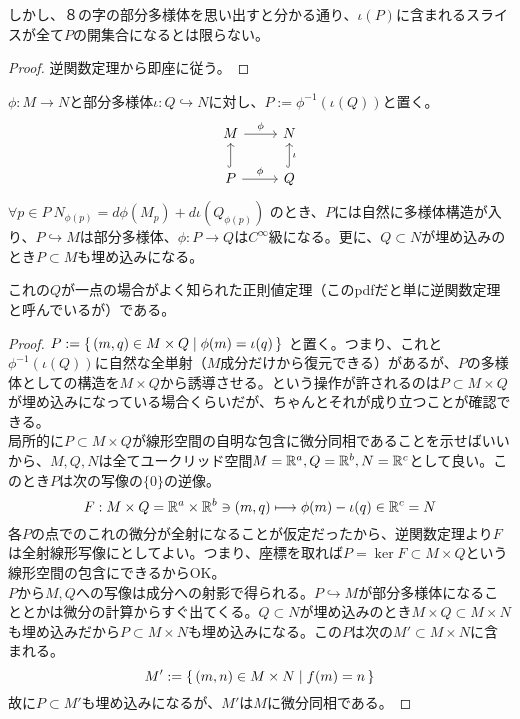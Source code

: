 しかし、８の字の部分多様体を思い出すと分かる通り、$\iota(P)$に含まれるスライスが全て$P$の開集合になるとは限らない。
\begin{proof}
    逆関数定理から即座に従う。
\end{proof}
\begin{thm}[正則値定理]
    $\phi:M\to N$と部分多様体$\iota:Q\hookrightarrow N$に対し、$P:=\phi^{-1}(\iota(Q))$と置く。
    \[\begin{tikzcd}
        M\arrow[r,"\phi"] &N\\
        P\arrow[u,hook]\arrow[r,"\phi"] &Q\arrow[u,hook,"\iota"']
    \end{tikzcd}\]
    $\forall p\in P\ N_{\phi(p)}=d\phi(M_p)+d\iota(Q_{\phi(p)})$ のとき、$P$には自然に多様体構造が入り、$P\hookrightarrow M$は部分多様体、$\phi:P\to Q$は$C^\infty$級になる。更に、$Q\subset N$が埋め込みのとき$P\subset M$も埋め込みになる。
\end{thm}
これの$Q$が一点の場合がよく知られた正則値定理（このpdfだと単に逆関数定理と呼んでいるが）である。
\begin{proof}
    $P:=\{\, (m,q)\in M\times Q\mid \phi(m)=\iota(q)\,\}$ と置く。つまり、これと$\phi^{-1}(\iota(Q))$に自然な全単射（$M$成分だけから復元できる）があるが、$P$の多様体としての構造を$M\times Q$から誘導させる。という操作が許されるのは$P\subset M\times Q$が埋め込みになっている場合くらいだが、ちゃんとそれが成り立つことが確認できる。\\
    局所的に$P\subset M\times Q$が線形空間の自明な包含に微分同相であることを示せばいいから、$M,Q,N$は全てユークリッド空間$M=\mathbb{R}^a,Q=\mathbb{R}^b,N=\mathbb{R}^c$として良い。このとき$P$は次の写像の$\{0\}$の逆像。
    \[F:M\times Q=\mathbb{R}^a\times\mathbb{R}^b\ni(m,q)\longmapsto \phi(m)-\iota(q)\in\mathbb{R}^c=N\]
    各$P$の点でのこれの微分が全射になることが仮定だったから、逆関数定理より$F$は全射線形写像にとしてよい。つまり、座標を取れば$P=\ker F\subset M\times Q$という線形空間の包含にできるからOK。\\
    $P$から$M,Q$への写像は成分への射影で得られる。$P\hookrightarrow M$が部分多様体になることとかは微分の計算からすぐ出てくる。$Q\subset N$が埋め込みのとき$M\times Q\subset M\times N$も埋め込みだから$P\subset M\times N$も埋め込みになる。この$P$は次の$M'\subset M\times N$に含まれる。
    \[M':=\{\, (m,n)\in M\times N\mid f(m)=n\,\}\]
    故に$P\subset M'$も埋め込みになるが、$M'$は$M$に微分同相である。
\end{proof}


\ \\
